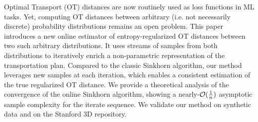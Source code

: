 Optimal Transport (OT) distances are now routinely used as loss functions in ML tasks. Yet, computing OT distances between arbitrary (i.e. not necessarily discrete) probability distributions remains an open problem. This paper introduces a new online estimator of entropy-regularized OT distances between two such arbitrary distributions. It uses streams of samples from both distributions to iteratively enrich a non-parametric representation of the transportation plan. Compared to the classic Sinkhorn algorithm, our method leverages new samples at each iteration, which enables a consistent estimation of the true regularized OT distance. We provide a theoretical analysis of the convergence of the online Sinkhorn algorithm, showing a nearly-$\mathcal{O}(\frac{1}{n})$ asymptotic sample complexity for the iterate sequence. We validate our method on synthetic data and on the Stanford 3D repository.